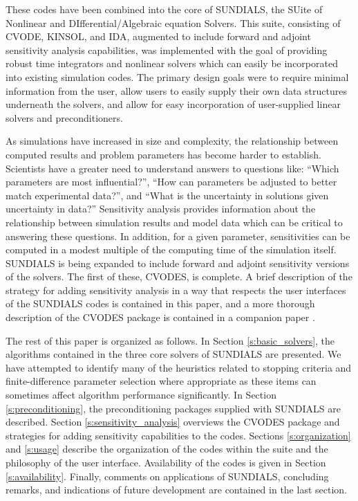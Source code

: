These codes have been combined into the core of SUNDIALS, the  
SUite of Nonlinear and DIfferential/Algebraic equation Solvers.  
This suite, consisting of CVODE, KINSOL, and IDA, augmented to include
forward and adjoint sensitivity 
analysis capabilities, was implemented with the goal of providing
robust time integrators and nonlinear solvers which can easily be 
incorporated into existing simulation codes.  The primary design 
goals were to require minimal information from the user, allow users 
to easily supply their own data structures underneath the solvers, 
and allow for easy incorporation of user-supplied linear solvers
and preconditioners.

As simulations have increased in size and complexity, the 
relationship between computed results and problem parameters has 
become harder to establish.  Scientists have a greater need to
understand answers to questions like: ``Which parameters are 
most influential?'', ``How can parameters be adjusted to better 
match experimental data?'', and ``What is the uncertainty in solutions 
given uncertainty in data?''  Sensitivity analysis provides 
information about the relationship between simulation results and model 
data which can be critical to answering these questions.  In addition, for 
a given parameter, sensitivities can be computed in a modest multiple of 
the computing time of the simulation itself.  
SUNDIALS is being expanded to 
include forward and adjoint sensitivity versions of the solvers.
The first of these, CVODES, is complete.  A brief description of the
strategy for adding sensitivity analysis in a way that respects the
user interfaces of the SUNDIALS codes is contained in this paper, and 
a more thorough description of the CVODES package is contained in a 
companion paper \cite{SeHi:03}.

The rest of this paper is organized as follows.  In Section 
\ref{s:basic_solvers}, the algorithms contained in the three 
core solvers of SUNDIALS are presented.  
We have attempted to identify many of the heuristics related to 
stopping criteria and finite-difference parameter selection
where appropriate as these items 
can sometimes affect algorithm performance significantly.
In Section \ref{s:preconditioning}, the
preconditioning packages supplied with SUNDIALS are
described.  Section \ref{s:sensitivity_analysis} overviews
the CVODES package and strategies for adding sensitivity 
capabilities to the codes.  Sections \ref{s:organization} and 
\ref{s:usage} describe the organization of the codes within the 
suite and the philosophy of the user interface.   
Availability of the codes is given in 
Section \ref{s:availability}.  Finally, comments on 
applications of SUNDIALS, concluding remarks, and indications 
of future development
are contained in the last section.



